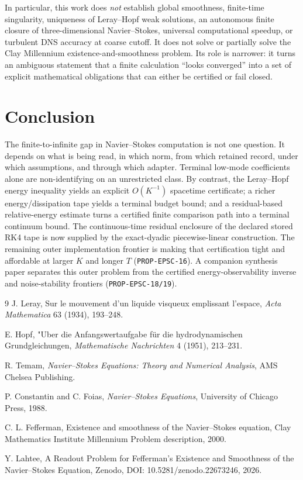 \documentclass[11pt]{article}
\theoremstyle{definition}
\begin{document}
In particular, this work does \emph{not} establish global smoothness, finite-time singularity,
uniqueness of Leray--Hopf weak solutions, an autonomous finite closure of three-dimensional
Navier--Stokes, universal computational speedup, or turbulent DNS accuracy at coarse cutoff.  It
does not solve or partially solve the Clay Millennium existence-and-smoothness problem.  Its role
is narrower: it turns an ambiguous statement that a finite calculation ``looks converged'' into a
set of explicit mathematical obligations that can either be certified or fail closed.

\section{Conclusion}

The finite-to-infinite gap in Navier--Stokes computation is not one question.  It depends on what is
being read, in which norm, from which retained record, under which assumptions, and through which
adapter.  Terminal low-mode coefficients alone are non-identifying on an unrestricted class.  By
contrast, the Leray--Hopf energy inequality yields an explicit $O(K^{-1})$ spacetime certificate;
a richer energy/dissipation tape yields a terminal budget bound; and a residual-based
relative-energy estimate turns a certified finite comparison path into a terminal continuum bound.
The continuous-time residual enclosure of the declared stored RK4 tape is now supplied by the
exact-dyadic piecewise-linear construction.  The remaining outer implementation frontier is making
that certification tight and affordable at larger $K$ and longer $T$ (\texttt{PROP-EPSC-16}).
A companion synthesis paper separates this outer problem from the certified energy-observability
inverse and noise-stability frontiers (\texttt{PROP-EPSC-18/19}).

\begin{thebibliography}{9}
J. Leray,
\newblock Sur le mouvement d'un liquide visqueux emplissant l'espace,
\newblock \emph{Acta Mathematica} 63 (1934), 193--248.

E. Hopf,
\newblock "Uber die Anfangswertaufgabe f\"ur die hydrodynamischen Grundgleichungen,
\newblock \emph{Mathematische Nachrichten} 4 (1951), 213--231.

R. Temam,
\newblock \emph{Navier--Stokes Equations: Theory and Numerical Analysis},
\newblock AMS Chelsea Publishing.

P. Constantin and C. Foias,
\newblock \emph{Navier--Stokes Equations},
\newblock University of Chicago Press, 1988.

C. L. Fefferman,
\newblock Existence and smoothness of the Navier--Stokes equation,
\newblock Clay Mathematics Institute Millennium Problem description, 2000.

Y. Lahtee,
\newblock A Readout Problem for Fefferman's Existence and Smoothness of the Navier--Stokes Equation,
\newblock Zenodo, DOI: 10.5281/zenodo.22673246, 2026.
\end{thebibliography}
\end{document}
